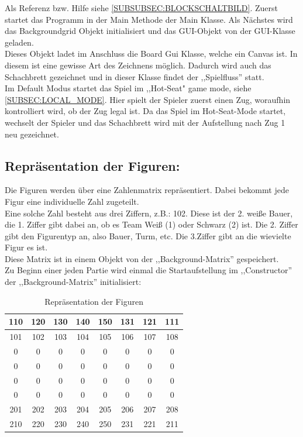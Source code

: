 \documentclass[12pt,a4paper]{article}
\newcommand{\cmnt}[1]{}			%
\begin{document}
{\cmnt{Hier soll erklärt werden wie JavaChess initialisiert wird.}

Als Referenz bzw. Hilfe siehe \ref{SUBSUBSEC:BLOCKSCHALTBILD}.
Zuerst startet das Programm in der Main Methode der Main Klasse. Als Nächstes wird das Backgroundgrid Objekt initialisiert und das GUI-Objekt von der GUI-Klasse geladen. \\
Dieses Objekt ladet im Anschluss die Board Gui Klasse, welche ein Canvas ist. In diesem ist eine gewisse Art des Zeichnens möglich. Dadurch wird auch das Schachbrett gezeichnet und in dieser Klasse findet der ,,Spielfluss'' statt. \\ 
Im Default Modus startet das Spiel im ,,Hot-Seat" game mode, siehe \ref{SUBSEC:LOCAL_MODE}. Hier spielt der Spieler zuerst einen Zug, woraufhin kontrolliert wird, ob der Zug legal ist. Da das Spiel im Hot-Seat-Mode startet, wechselt der Spieler und das Schachbrett wird mit der Aufstellung nach Zug 1 neu gezeichnet.

\subsection{Repräsentation der Figuren:}

Die Figuren werden über eine Zahlenmatrix repräsentiert. Dabei bekommt jede Figur eine individuelle Zahl zugeteilt. \\
Eine solche Zahl besteht aus drei Ziffern, z.B.: 102. Diese ist der 2. weiße Bauer, die 1. Ziffer gibt dabei an, ob es Team Weiß (1) oder Schwarz (2) ist. Die 2. Ziffer gibt den Figurentyp an, also Bauer, Turm, etc. Die 3.Ziffer gibt an die wievielte Figur es ist. \\
Diese Matrix ist in einem Objekt von der ,,Background-Matrix'' gespeichert. \\
Zu Beginn einer jeden Partie wird einmal die Startaufstellung im ,,Constructor'' der ,,Background-Matrix'' initialisiert:

	\begin{table}[H]
		\centering
		\begin{tabular}{| c | c | c | c | c | c | c | c |}
			\hline
			110 & 120 	& 	130 & 140 	& 150 	& 131 	& 121 	& 	111 \\ \hline
			101 & 102 	& 	103 & 	104 & 	105 & 	106 & 	107 & 	108 \\ \hline
			0	&	0	& 	0	&	0	&	0	&	0	&	0	&	0	\\ \hline
			0	&	0	& 	0	&	0	&	0	&	0	&	0	&	0 	\\ \hline
			0	&	0	& 	0	&	0	&	0	&	0	&	0	&	0 	\\ \hline
			0	&	0	& 	0	&	0	&	0	&	0	&	0	&	0 	\\ \hline
			201 &	202 &	203	&	204	&	205	&	206	&	207	&	208	\\ \hline
			210 & 	220	&	230	&	240	&	250	&	231	&	221	&	211 \\ 
			\hline	
		\end{tabular}
		\caption{Repräsentation der Figuren}
		\label{TABLE:REPRESENTATION-MEEPLES}
	\end{table}

}
\end{document}
